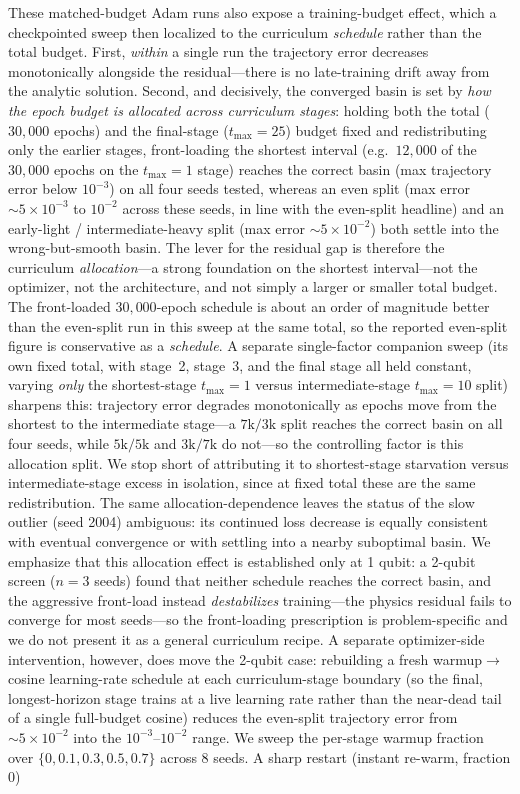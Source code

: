 \documentclass[11pt]{article}
\begin{document}
These matched-budget Adam runs also expose a training-budget effect, which a checkpointed sweep then localized to the curriculum \emph{schedule} rather than the total budget. First, \emph{within} a single run the trajectory error decreases monotonically alongside the residual---there is no late-training drift away from the analytic solution. Second, and decisively, the converged basin is set by \emph{how the epoch budget is allocated across curriculum stages}: holding both the total ($30{,}000$ epochs) and the final-stage ($t_{\max}=25$) budget fixed and redistributing only the earlier stages, front-loading the shortest interval (e.g.\ $12{,}000$ of the $30{,}000$ epochs on the $t_{\max}=1$ stage) reaches the correct basin (max trajectory error below $10^{-3}$) on all four seeds tested, whereas an even split (max error $\sim 5\times10^{-3}$ to $10^{-2}$ across these seeds, in line with the even-split headline) and an early-light / intermediate-heavy split (max error $\sim 5\times10^{-2}$) both settle into the wrong-but-smooth basin. The lever for the residual gap is therefore the curriculum \emph{allocation}---a strong foundation on the shortest interval---not the optimizer, not the architecture, and not simply a larger or smaller total budget. The front-loaded $30{,}000$-epoch schedule is about an order of magnitude better than the even-split run in this sweep at the same total, so the reported even-split figure is conservative as a \emph{schedule}. A separate single-factor companion sweep (its own fixed total, with stage~2, stage~3, and the final stage all held constant, varying \emph{only} the shortest-stage $t_{\max}=1$ versus intermediate-stage $t_{\max}=10$ split) sharpens this: trajectory error degrades monotonically as epochs move from the shortest to the intermediate stage---a $7\text{k}/3\text{k}$ split reaches the correct basin on all four seeds, while $5\text{k}/5\text{k}$ and $3\text{k}/7\text{k}$ do not---so the controlling factor is this allocation split. We stop short of attributing it to shortest-stage starvation versus intermediate-stage excess in isolation, since at fixed total these are the same redistribution. The same allocation-dependence leaves the status of the slow outlier (seed 2004) ambiguous: its continued loss decrease is equally consistent with eventual convergence or with settling into a nearby suboptimal basin. We emphasize that this allocation effect is established only at 1 qubit: a 2-qubit screen ($n=3$ seeds) found that neither schedule reaches the correct basin, and the aggressive front-load instead \emph{destabilizes} training---the physics residual fails to converge for most seeds---so the front-loading prescription is problem-specific and we do not present it as a general curriculum recipe. A separate optimizer-side intervention, however, does move the 2-qubit case: rebuilding a fresh warmup$\rightarrow$cosine learning-rate schedule at each curriculum-stage boundary (so the final, longest-horizon stage trains at a live learning rate rather than the near-dead tail of a single full-budget cosine) reduces the even-split trajectory error from $\sim 5\times10^{-2}$ into the $10^{-3}$--$10^{-2}$ range. We sweep the per-stage warmup fraction over $\{0, 0.1, 0.3, 0.5, 0.7\}$ across 8 seeds. A sharp restart (instant re-warm, fraction $0$) 
\end{document}
